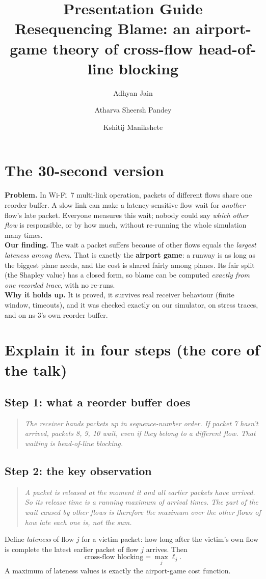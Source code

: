 \documentclass[11pt]{article}
\title{Presentation Guide\\\large Resequencing Blame: an airport-game theory of cross-flow head-of-line blocking}
\author{Adhyan Jain \and Atharva Sheersh Pandey \and Kshitij Manikshete}
\date{}
\newcommand{\say}[1]{\begin{quote}\itshape #1\end{quote}}
\newcommand{\keybox}[1]{\par\noindent\colorbox{box}{\parbox{\dimexpr\linewidth-2\fboxsep}{#1}}\par\medskip}
\begin{document}
\maketitle

\section{The 30-second version}
\keybox{\textbf{Problem.} In Wi-Fi~7 multi-link operation, packets of different flows share one reorder buffer. A slow link can make a latency-sensitive flow wait for \emph{another} flow's late packet. Everyone measures this wait; nobody could say \emph{which other flow} is responsible, or by how much, without re-running the whole simulation many times.\\[3pt]
\textbf{Our finding.} The wait a packet suffers because of other flows equals the \emph{largest lateness among them}. That is exactly the \textbf{airport game}: a runway is as long as the biggest plane needs, and the cost is shared fairly among planes. Its fair split (the Shapley value) has a closed form, so blame can be computed \emph{exactly from one recorded trace}, with no re-runs.\\[3pt]
\textbf{Why it holds up.} It is proved, it survives real receiver behaviour (finite window, timeouts), and it was checked exactly on our simulator, on stress traces, and on ns-3's own reorder buffer.}

\section{Explain it in four steps (the core of the talk)}
\subsection*{Step 1: what a reorder buffer does}
\say{The receiver hands packets up in sequence-number order. If packet 7 hasn't arrived, packets 8, 9, 10 wait, even if they belong to a different flow. That waiting is head-of-line blocking.}

\subsection*{Step 2: the key observation}
\say{A packet is released at the moment it and \emph{all earlier packets} have arrived. So its release time is a running maximum of arrival times. The part of the wait caused by other flows is therefore the \emph{maximum} over the other flows of how late each one is, not the sum.}
Define \emph{lateness} of flow $j$ for a victim packet: how long after the victim's own flow is complete the latest earlier packet of flow $j$ arrives. Then
\[
\text{cross-flow blocking}=\max_j \ell_j .
\]
A maximum of lateness values is exactly the airport-game cost function.
\end{document}
